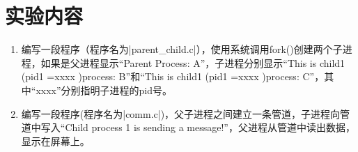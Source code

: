 \documentclass[cs4size,a4paper,nofonts]{ctexart}
\begin{document}

\setcounter{part}{1}


\iffalse
\section{实验目的}
\begin{enumerate}
\item 进一步认识并发执行的概念，认识父子进程及进程创建原理；
\item 了解Linux系统中进程通信的基本原理。
\end{enumerate}

\section{实验环境}
一台装有Linux操作系统（Fedora 7），至少具有256M内存的微机。

\section{预备知识}
\begin{enumerate}
\item gcc编译器的使用
\item fork系统调用：创建一个新进程
\item getpid系统调用：获得一个进程的pid
\item wait系统调用：发出调用的进程等待子进程结束
\item pipe系统调用：建立管道
\item write系统调用：向文件中写数据
\item read系统调用：从文件中读数据
\end{enumerate}
\fi

\section{实验内容}
\begin{enumerate}[label={(\arabic*)}]
\item 编写一段程序（程序名为|parent_child.c|），使用系统调用fork()创建两个子进程，如果是父进程显示“Parent Process: A”，子进程分别显示“This is child1 (pid1 =xxxx )process: B”和“This is child1 (pid1 =xxxx )process: C”，其中“xxxx”分别指明子进程的pid号。
\item 编写一段程序(程序名为|comm.c|)，父子进程之间建立一条管道，子进程向管道中写入“Child process 1 is sending a message!”，父进程从管道中读出数据，显示在屏幕上。
\end{enumerate}
\end{document}
